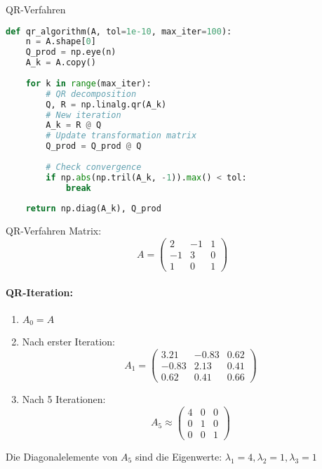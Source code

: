 \begin{examplecode}{QR-Verfahren}
\begin{lstlisting}[language=Python, style=basesmol]
def qr_algorithm(A, tol=1e-10, max_iter=100):
    n = A.shape[0]
    Q_prod = np.eye(n)
    A_k = A.copy()
    
    for k in range(max_iter):
        # QR decomposition
        Q, R = np.linalg.qr(A_k)
        # New iteration
        A_k = R @ Q
        # Update transformation matrix
        Q_prod = Q_prod @ Q
        
        # Check convergence
        if np.abs(np.tril(A_k, -1)).max() < tol:
            break
            
    return np.diag(A_k), Q_prod
\end{lstlisting}
\end{examplecode}

\begin{example2}{QR-Verfahren}
Matrix:
$$A = \begin{pmatrix}
2 & -1 & 1\\
-1 & 3 & 0\\
1 & 0 & 1
\end{pmatrix}$$

\paragraph{QR-Iteration:}
\begin{enumerate}
    \item $A_0 = A$
    \item Nach erster Iteration:
    $$A_1 = \begin{pmatrix}
    3.21 & -0.83 & 0.62\\
    -0.83 & 2.13 & 0.41\\
    0.62 & 0.41 & 0.66
    \end{pmatrix}$$
    \item Nach 5 Iterationen:
    $$A_5 \approx \begin{pmatrix}
    4 & 0 & 0\\
    0 & 1 & 0\\
    0 & 0 & 1
    \end{pmatrix}$$
\end{enumerate}

Die Diagonalelemente von $A_5$ sind die Eigenwerte: $\lambda_1 = 4, \lambda_2 = 1, \lambda_3 = 1$
\end{example2}

